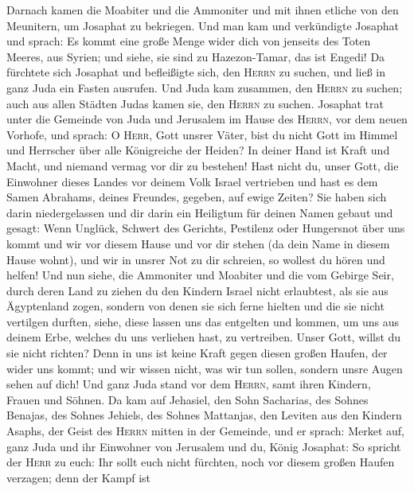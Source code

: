  Darnach kamen die Moabiter und die Ammoniter und mit
ihnen etliche von den Meunitern, um Josaphat zu bekriegen.
 Und man kam und verkündigte Josaphat und sprach: Es kommt
eine große Menge wider dich von jenseits des Toten Meeres, aus Syrien;
und siehe, sie sind zu Hazezon-Tamar, das ist Engedi!  Da
fürchtete sich Josaphat und befleißigte sich, den \textsc{Herrn} zu
suchen, und ließ in ganz Juda ein Fasten ausrufen.  Und
Juda kam zusammen, den \textsc{Herrn} zu suchen; auch aus allen Städten
Judas kamen sie, den \textsc{Herrn} zu suchen.  Josaphat
trat unter die Gemeinde von Juda und Jerusalem im Hause des
\textsc{Herrn}, vor dem neuen Vorhofe,  und sprach: O
\textsc{Herr}, Gott unsrer Väter, bist du nicht Gott im Himmel und
Herrscher über alle Königreiche der Heiden? In deiner Hand ist Kraft und
Macht, und niemand vermag vor dir zu bestehen!  Hast nicht
du, unser Gott, die Einwohner dieses Landes vor deinem Volk Israel
vertrieben und hast es dem Samen Abrahams, deines Freundes, gegeben, auf
ewige Zeiten?  Sie haben sich darin niedergelassen und dir
darin ein Heiligtum für deinen Namen gebaut und gesagt: 
Wenn Unglück, Schwert des Gerichts, Pestilenz oder Hungersnot über uns
kommt und wir vor diesem Hause und vor dir stehen (da dein Name in
diesem Hause wohnt), und wir in unsrer Not zu dir schreien, so wollest
du hören und helfen!  Und nun siehe, die Ammoniter und
Moabiter und die vom Gebirge Seir, durch deren Land zu ziehen du den
Kindern Israel nicht erlaubtest, als sie aus Ägyptenland zogen, sondern
von denen sie sich ferne hielten und die sie nicht vertilgen durften,
 siehe, diese lassen uns das entgelten und kommen, um uns
aus deinem Erbe, welches du uns verliehen hast, zu vertreiben.
 Unser Gott, willst du sie nicht richten? Denn in uns ist
keine Kraft gegen diesen großen Haufen, der wider uns kommt; und wir
wissen nicht, was wir tun sollen, sondern unsre Augen sehen auf dich!
 Und ganz Juda stand vor dem \textsc{Herrn}, samt ihren
Kindern, Frauen und Söhnen.  Da kam auf Jehasiel, den
Sohn Sacharias, des Sohnes Benajas, des Sohnes Jehiels, des Sohnes
Mattanjas, den Leviten aus den Kindern Asaphs, der Geist des
\textsc{Herrn} mitten in der Gemeinde, und er sprach: 
Merket auf, ganz Juda und ihr Einwohner von Jerusalem und du, König
Josaphat: So spricht der \textsc{Herr} zu euch: Ihr sollt euch nicht
fürchten, noch vor diesem großen Haufen verzagen; denn der Kampf ist
